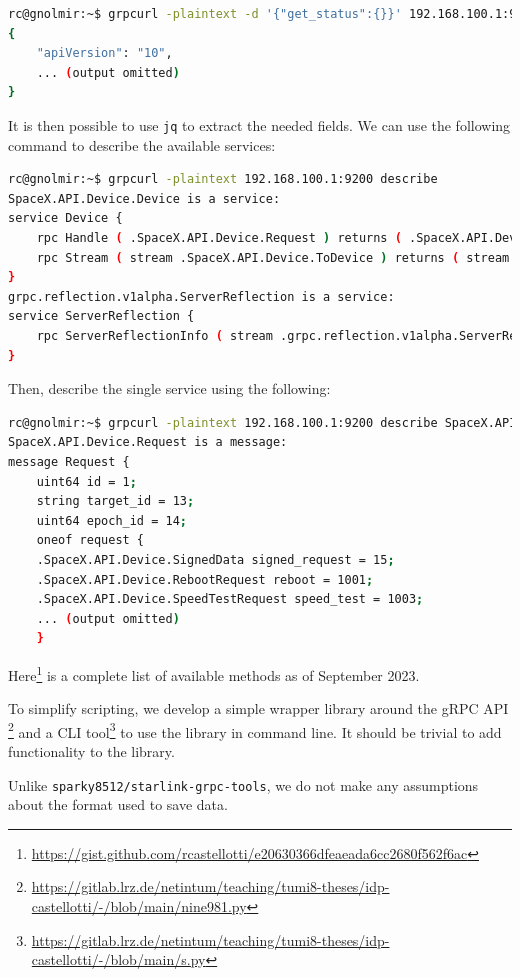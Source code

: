 \documentclass[IN,11pt,twoside,openright,idp,english]{tumthesis}
\begin{document}
\begin{lstlisting}[language=bash]
rc@gnolmir:~$ grpcurl -plaintext -d '{"get_status":{}}' 192.168.100.1:9200 SpaceX.API.Device.Device/Handle
{
    "apiVersion": "10",
    ... (output omitted)
}
\end{lstlisting}

It is then possible to use \texttt{jq} to extract the needed fields. We can use the following command to describe the
available services:
    
\begin{lstlisting}[language=bash]
rc@gnolmir:~$ grpcurl -plaintext 192.168.100.1:9200 describe
SpaceX.API.Device.Device is a service:
service Device {
    rpc Handle ( .SpaceX.API.Device.Request ) returns ( .SpaceX.API.Device.Response );
    rpc Stream ( stream .SpaceX.API.Device.ToDevice ) returns ( stream .SpaceX.API.Device.FromDevice );
}
grpc.reflection.v1alpha.ServerReflection is a service:
service ServerReflection {
    rpc ServerReflectionInfo ( stream .grpc.reflection.v1alpha.ServerReflectionRequest ) returns ( stream .grpc.reflection.v1alpha.ServerReflectionResponse );
}
\end{lstlisting}
    
Then, describe the single service using the following:
    
\begin{lstlisting}[language=bash]
rc@gnolmir:~$ grpcurl -plaintext 192.168.100.1:9200 describe SpaceX.API.Device.Request
SpaceX.API.Device.Request is a message:
message Request {
    uint64 id = 1;
    string target_id = 13;
    uint64 epoch_id = 14;
    oneof request {
    .SpaceX.API.Device.SignedData signed_request = 15;
    .SpaceX.API.Device.RebootRequest reboot = 1001;
    .SpaceX.API.Device.SpeedTestRequest speed_test = 1003;
    ... (output omitted)
    }
\end{lstlisting}
    
Here\footnote{\url{https://gist.github.com/rcastellotti/e20630366dfeaeada6cc2680f562f6ac}} is a complete list of
available methods as of September 2023.

To simplify scripting, we develop a simple wrapper library around the gRPC API
\footnote{\url{https://gitlab.lrz.de/netintum/teaching/tumi8-theses/idp-castellotti/-/blob/main/nine981.py}} and a CLI
tool\footnote{\url{https://gitlab.lrz.de/netintum/teaching/tumi8-theses/idp-castellotti/-/blob/main/s.py}} to use the
library in command line. It should be trivial to add functionality to the library.

Unlike \texttt{sparky8512/starlink-grpc-tools}, we do not make any assumptions about the format used to save data.
\end{document}
